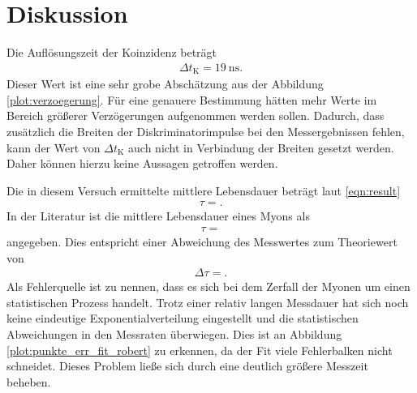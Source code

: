 \section{Diskussion}
\label{sec:Diskussion}

Die Auflösungszeit der Koinzidenz beträgt
\begin{align*}
  \Delta t_\text{K} = \SI{19}{\nano\second}.
\end{align*}
Dieser Wert ist eine sehr grobe Abschätzung aus der Abbildung \ref{plot:verzoegerung}.
Für eine genauere Bestimmung hätten mehr Werte im Bereich größerer Verzögerungen aufgenommen werden sollen.
Dadurch, dass zusätzlich die Breiten der Diskriminatorimpulse bei den Messergebnissen fehlen, kann der Wert von $\Delta t_\text{K}$ auch nicht in Verbindung der Breiten gesetzt werden.
Daher können hierzu keine Aussagen getroffen werden.

Die in diesem Versuch ermittelte mittlere Lebensdauer beträgt laut \eqref{eqn:result}
\begin{align*}
  \tau = .
\end{align*}
In der Literatur \cite{Agashe:2014kda} ist die mittlere Lebensdauer eines Myons als
\begin{align*}
  \tau = 
\end{align*}
angegeben.
Dies entspricht einer Abweichung des Messwertes zum Theoriewert von
\begin{align*}
  \Delta \tau = .
\end{align*}
Als Fehlerquelle ist zu nennen, dass es sich bei dem Zerfall der Myonen um einen statistischen Prozess handelt.
Trotz einer relativ langen Messdauer hat sich noch keine eindeutige Exponentialverteilung eingestellt und die statistischen Abweichungen in den Messraten überwiegen.
Dies ist an Abbildung \ref{plot:punkte_err_fit_robert} zu erkennen, da der Fit viele Fehlerbalken nicht schneidet.
Dieses Problem ließe sich durch eine deutlich größere Messzeit beheben.\\

